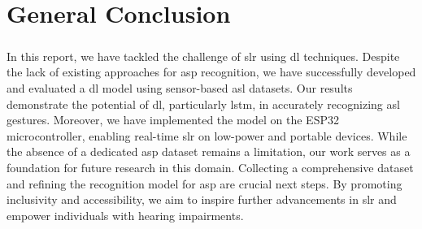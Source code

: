\chapter*{General Conclusion}
\paragraph{}
In this report, we have tackled the challenge of \ac{slr} using \ac{dl} techniques. Despite the lack of existing approaches for \ac{asp} recognition, we have successfully developed and evaluated a \ac{dl} model using sensor-based \ac{asl} datasets. Our results demonstrate the potential of \ac{dl}, particularly \ac{lstm}, in accurately recognizing \ac{asl} gestures. Moreover, we have implemented the model on the ESP32 microcontroller, enabling real-time \ac{slr} on low-power and portable devices. While the absence of a dedicated \ac{asp} dataset remains a limitation, our work serves as a foundation for future research in this domain. Collecting a comprehensive dataset and refining the recognition model for \ac{asp} are crucial next steps. By promoting inclusivity and accessibility, we aim to inspire further advancements in \ac{slr} and empower individuals with hearing impairments.
